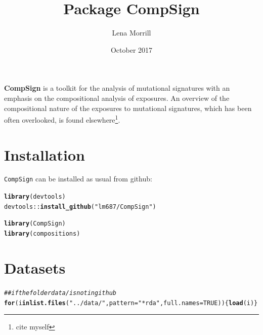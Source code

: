 \documentclass{article}\usepackage[]{graphicx}\usepackage[]{color}
\title{Package \textbf{CompSign}}
\author{Lena Morrill}
\date{October 2017}
\makeatletter
\newcommand{\hlnum}[1]{\textcolor[rgb]{0.686,0.059,0.569}{#1}}%
\newcommand{\hlstr}[1]{\textcolor[rgb]{0.192,0.494,0.8}{#1}}%
\newcommand{\hlcom}[1]{\textcolor[rgb]{0.678,0.584,0.686}{\textit{#1}}}%
\newcommand{\hlopt}[1]{\textcolor[rgb]{0,0,0}{#1}}%
\newcommand{\hlstd}[1]{\textcolor[rgb]{0.345,0.345,0.345}{#1}}%
\newcommand{\hlkwa}[1]{\textcolor[rgb]{0.161,0.373,0.58}{\textbf{#1}}}%
\newcommand{\hlkwc}[1]{\textcolor[rgb]{0.333,0.667,0.333}{#1}}%
\newcommand{\hlkwd}[1]{\textcolor[rgb]{0.737,0.353,0.396}{\textbf{#1}}}%
\newenvironment{kframe}{%
 \def\at@end@of@kframe{}%
 \ifinner\ifhmode%
  \def\at@end@of@kframe{\end{minipage}}%
  \begin{minipage}{\columnwidth}%
 \fi\fi%
 \def\FrameCommand##1{\hskip\@totalleftmargin \hskip-\fboxsep
 \colorbox{shadecolor}{##1}\hskip-\fboxsep
     \hskip-\linewidth \hskip-\@totalleftmargin \hskip\columnwidth}%
 \MakeFramed {\advance\hsize-\width
   \@totalleftmargin\z@ \linewidth\hsize
   \@setminipage}}%
 {\par\unskip\endMakeFramed%
 \at@end@of@kframe}
\newenvironment{knitrout}{}{} %
\makeatother
\begin{document}
\maketitle

\textbf{CompSign} is a toolkit for the analysis of mutational signatures with an emphasis on the compositional analysis of exposures. An overview of the compositional nature of the exposures to mutational signatures, which has been often overlooked, is found elsewhere\footnote{cite myself}.





\section{Installation}
\texttt{CompSign} can be installed as usual from github:

\begin{knitrout}
\color{fgcolor}\begin{kframe}
\begin{alltt}
\hlkwd{library}\hlstd{(devtools)}
\hlstd{devtools}\hlopt{::}\hlkwd{install_github}\hlstd{(}\hlstr{"lm687/CompSign"}\hlstd{)}
\end{alltt}
\end{kframe}
\end{knitrout}

\begin{knitrout}
\color{fgcolor}\begin{kframe}
\begin{alltt}
\hlkwd{library}\hlstd{(CompSign)}
\hlkwd{library}\hlstd{(compositions)}
\end{alltt}
\end{kframe}
\end{knitrout}

\clearpage
\section{Datasets}
\begin{knitrout}
\color{fgcolor}\begin{kframe}
\begin{alltt}
\hlcom{## if the folder data/ is not in github}
\hlkwa{for}\hlstd{(i} \hlkwa{in} \hlkwd{list.files}\hlstd{(}\hlstr{"../data/"}\hlstd{,} \hlkwc{pattern} \hlstd{=} \hlstr{"*rda"}\hlstd{,} \hlkwc{full.names} \hlstd{=} \hlnum{TRUE}\hlstd{))\{}\hlkwd{load}\hlstd{(i)\}}
\end{alltt}
\end{kframe}
\end{knitrout}
\end{document}
